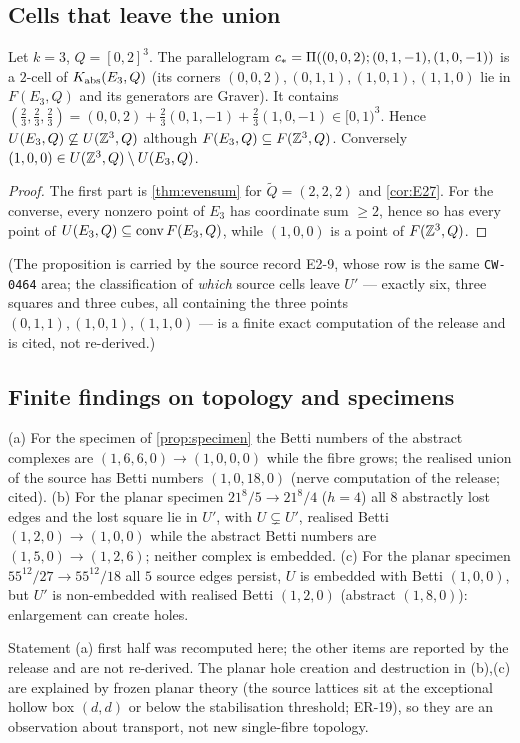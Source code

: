\subsection{Cells that leave the union}
\begin{proposition}\label{prop:E29}\sloppy
Let $k=3$, $Q=[0,2]^3$. The parallelogram $c_*=\Pi((0,0,2);(0,1,-1),(1,0,-1))$ is a $2$-cell of $K_{\mathrm{abs}}(E_3,Q)$ (its corners $(0,0,2),(0,1,1),(1,0,1),(1,1,0)$ lie in $F(E_3,Q)$ and its generators are Graver). It contains $(\tfrac23,\tfrac23,\tfrac23)=(0,0,2)+\tfrac23(0,1,-1)+\tfrac23(1,0,-1)\in[0,1)^3$. Hence $U(E_3,Q)\not\subseteq U(\mathbb Z^3,Q)$ although $F(E_3,Q)\subseteq F(\mathbb Z^3,Q)$. Conversely $(1,0,0)\in U(\mathbb Z^3,Q)\setminus U(E_3,Q)$.
\end{proposition}
\begin{proof}
The first part is \cref{thm:evensum} for $\tilde Q=(2,2,2)$ and \cref{cor:E27}. For the converse, every nonzero point of $E_3$ has coordinate sum $\ge2$, hence so has every point of $U(E_3,Q)\subseteq\operatorname{conv} F(E_3,Q)$, while $(1,0,0)$ is a point of $F(\mathbb Z^3,Q)$. \qedhere
\end{proof}
(The proposition is carried by the source record E2-9, whose row is the same \texttt{CW-0464} area; the classification of \emph{which} source cells leave $U'$ --- exactly six, three squares and three cubes, all containing the three points $(0,1,1),(1,0,1),(1,1,0)$ --- is a finite exact computation of the release and is cited, not re-derived.)

\subsection{Finite findings on topology and specimens}
\begin{proposition}[FINITE-EXACT; scope: the $k=3$ specimen and two planar specimens]\label{prop:topology}
(a) For the specimen of \cref{prop:specimen} the Betti numbers of the abstract complexes are $(1,6,6,0)\to(1,0,0,0)$ while the fibre grows; the realised union of the source has Betti numbers $(1,0,18,0)$ (nerve computation of the release; cited). (b) For the planar specimen $21^8/5\to21^8/4$ ($h=4$) all $8$ abstractly lost edges and the lost square lie in $U'$, with $U\subsetneq U'$, realised Betti $(1,2,0)\to(1,0,0)$ while the abstract Betti numbers are $(1,5,0)\to(1,2,6)$; neither complex is embedded. (c) For the planar specimen $55^{12}/27\to55^{12}/18$ all $5$ source edges persist, $U$ is embedded with Betti $(1,0,0)$, but $U'$ is non-embedded with realised Betti $(1,2,0)$ (abstract $(1,8,0)$): enlargement can create holes.
\end{proposition}
Statement (a) first half was recomputed here; the other items are reported by the release and are not re-derived. The planar hole creation and destruction in (b),(c) are explained by frozen planar theory (the source lattices sit at the exceptional hollow box $(d,d)$ or below the stabilisation threshold; ER-19), so they are an observation about transport, not new single-fibre topology.


